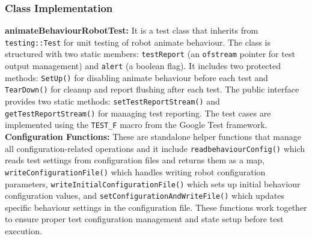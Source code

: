 \documentclass{CSSRforAfrica}
\begin{document}
\subsubsection*{Class Implementation}
\textbf{animateBehaviourRobotTest:} It is a test class that inherits from \texttt{testing::Test} for unit testing of robot animate behaviour. The class is structured with two static members: \texttt{testReport} (an \texttt{ofstream} pointer for test output management) and \texttt{alert} (a boolean flag). It includes two protected methods: \texttt{SetUp()} for disabling animate behaviour before each test and \texttt{TearDown()} for cleanup and report flushing after each test. The public interface provides two static methods: \texttt{setTestReportStream()} and \texttt{getTestReportStream()} for managing test reporting. The test cases are implemented using the \texttt{TEST\_F} macro from the Google Test framework.\\
\textbf{Configuration Functions:} These are standalone helper functions that manage all configuration-related operations and it include \texttt{readbehaviourConfig()} which reads test settings from configuration files and returns them as a map, \texttt{writeConfigurationFile()} which handles writing robot configuration parameters, \texttt{writeInitialConfigurationFile()} which sets up initial behaviour configuration values, and \texttt{setConfigurationAndWriteFile()} which updates specific behaviour settings in the configuration file. These functions work together to ensure proper test configuration management and state setup before test execution.
\end{document}
